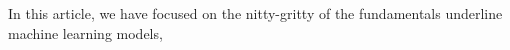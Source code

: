 In this article, we have focused on the nitty-gritty of the fundamentals underline machine learning models, 